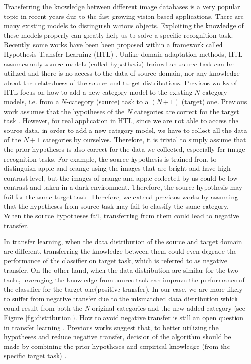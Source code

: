 Transferring the knowledge between different image databases is a very popular topic in recent years due to the fast growing vision-based applications. There are many existing models to distinguish various objects. Exploiting the knowledge of these models properly can greatly help us to solve a specific recognition task.
Recently, some works have been been proposed within a framework called Hypothesis Transfer Learning (HTL) \cite{tommasi2014learning} \cite{kuzborskij2013n} \cite{jie2011multiclass} \cite{kuzborskij2013stability}. Unlike domain adaptation methods, HTL assumes only source models (called hypothesis) trained on source task can be utilized and there is no access to the data of source domain, nor any knowledge about the relatedness of the source and target distributions. 
Previous works of HTL focus on how to add a new category model to the existing $N$-category models, i.e. from a $N$-category (source) task to a $(N+1)$ (target) one. 
Previous work assumes that the hypotheses of the $N$ categories are correct for the target task \cite{kuzborskij2013n}. However, for real application in HTL, since we are not able to access the source data, in order to add a new category model, we have to collect all the data of the $N+1$ categories by ourselves. Therefore, it is trivial to simply assume that the prior hypotheses is also correct for the data we collected, especially for image recognition tasks. For example, the source hypothesis is trained from to distinguish apple and orange using the images that are bright and have high contrast level, but the images of orange and apple collected by us could be low contrast and taken in a dark environment. Therefore, the source hypothesis may fail for the same target task.
Therefore, we extend previous works by assuming that the hypotheses from source task may fail to classify the same category. 
When the source hypotheses fail, transferring from them could lead to negative transfer. 

In transfer learning, when the data distribution of the source and target domain are different, transferring the knowledge between them could even degrade the performance of the classifier on target task, which is referred to as negative transfer. On the other hand, when the data distribution are similar for the two tasks, leveraging the knowledge from source task can improve the performance of the classifier for the target one(positive transfer).
In our case, we are more likely to suffer from negative transfer due to the mismatched data distribution which could result from both the $N$ original categories and the new added category (see Figure \ref{fig:distribution}). 
How to avoid negative transfer is still an open question in transfer learning \cite{Lu201514}.
Previous works suggest that, to better utilizing the hypotheses and reduce negative transfer, decision of the algorithm should be made by combining the prior hypotheses and empirical knowledge (from the specific target task) \cite{tommasi2014learning} \cite{kuzborskij2013n} \cite{yang2007cross} \cite{aytar2011tabula}.

